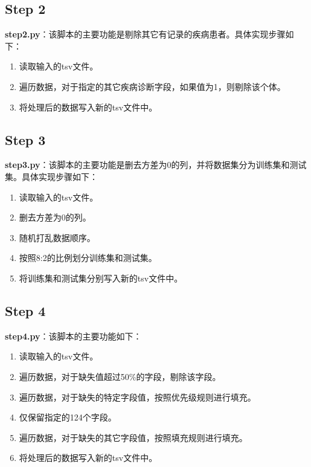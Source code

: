\documentclass[UTF8]{report}
\theoremstyle{MyLineTheoremStyle} %
\theoremstyle{MyBlockTheoremStyle} %
\theoremstyle{MySubsubsectionStyle} %
\begin{document}
\subsection*{Step 2}

\textbf{step2.py}：该脚本的主要功能是剔除其它有记录的疾病患者。具体实现步骤如下：
\begin{enumerate}
    \item 读取输入的tsv文件。
    \item 遍历数据，对于指定的其它疾病诊断字段，如果值为1，则剔除该个体。
    \item 将处理后的数据写入新的tsv文件中。
\end{enumerate}

\subsection*{Step 3}

\textbf{step3.py}：该脚本的主要功能是删去方差为0的列，并将数据集分为训练集和测试集。具体实现步骤如下：
\begin{enumerate}
    \item 读取输入的tsv文件。
    \item 删去方差为0的列。
    \item 随机打乱数据顺序。
    \item 按照8:2的比例划分训练集和测试集。
    \item 将训练集和测试集分别写入新的tsv文件中。
\end{enumerate}


\subsection*{Step 4}

\textbf{step4.py}：该脚本的主要功能如下：
\begin{enumerate}
    \item 读取输入的tsv文件。
    \item 遍历数据，对于缺失值超过50\%的字段，剔除该字段。
    \item 遍历数据，对于缺失的特定字段值，按照优先级规则进行填充。
    \item 仅保留指定的124个字段。
    \item 遍历数据，对于缺失的其它字段值，按照填充规则进行填充。
    \item 将处理后的数据写入新的tsv文件中。
\end{enumerate}
\end{document}
